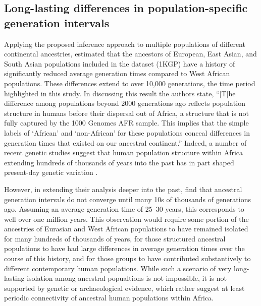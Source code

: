 \documentclass[]{article}
\begin{document}
\subsection*{Long-lasting differences in population-specific generation intervals}

Applying the proposed inference approach to multiple populations of different
continental ancestries, \citet{wang2023human} estimated that the ancestors of
European, East Asian, and South Asian populations included in the
\citet{1000genomes2015} dataset (1KGP) have a history of significantly reduced
average generation times compared to West African populations. These
differences extend to over 10,000 generations, the time period highlighted in
this study. In discussing this result the authors state, ``[T]he difference
among populations beyond 2000 generations ago reflects population structure in
humans before their dispersal out of Africa, a structure that is not fully
captured by the 1000 Genomes AFR sample. This implies that the simple labels of
`African' and `non-African' for these populations conceal differences in
generation times that existed on our ancestral continent.'' Indeed, a number of
recent genetic studies suggest that human population structure within Africa
extending hundreds of thousands of years into the past has in part shaped
present-day genetic variation
\citep{hammer2011genetic,hsieh2016model,hey2018phylogeny,
ragsdale2019models,durvasula2020recovering,lorente2019whole}.

However, in extending their analysis deeper into the past,
\citet{wang2023human} find that ancestral generation intervals do not converge
until many 10s of thousands of generations ago. Assuming an average generation
time of 25--30 years, this corresponds to well over one million years. This
observation would require some portion of the ancestries of Eurasian and West
African populations to have remained isolated for many hundreds of thousands of
years, for those structured ancestral populations to have had large differences
in average generation times over the course of this history, and for those
groups to have contributed substantively to different contemporary human
populations. While such a scenario of very long-lasting isolation among
ancestral popualtions is not impossible, it is not supported by genetic
\citep{ragsdale2022weakly,others} or archaeological
\citep{scerri2018did,others} evidence, which rather suggest at least periodic
connectivity of ancestral human populations within Africa.
\end{document}
